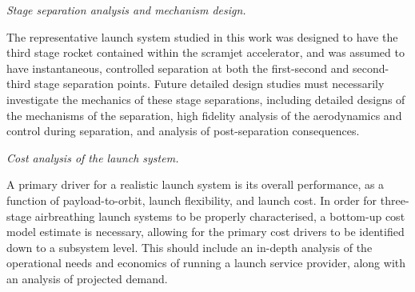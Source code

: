 \vspace{10pt}
	\textit{Stage separation analysis and mechanism design.}
	
\noindent
The representative launch system studied in this work was designed to have the third stage rocket contained within the scramjet accelerator, and was assumed to have instantaneous, controlled separation at both the first-second and second-third stage separation points. Future detailed design studies must necessarily investigate the mechanics of these stage separations, including detailed designs of the mechanisms of the separation, high fidelity analysis of the aerodynamics and control during separation, and analysis of post-separation consequences.


\vspace{10pt}
 \textit{Cost analysis of the launch system.}

 \noindent
A primary driver for a realistic launch system is its overall performance, as a function of payload-to-orbit, launch flexibility, and launch cost. In order for three-stage airbreathing launch systems to be properly characterised, a bottom-up cost model estimate is necessary, allowing for the primary cost drivers to be identified down to a subsystem level. This should include an in-depth analysis of the operational needs and economics of running a launch service provider, along with an analysis of projected demand.




